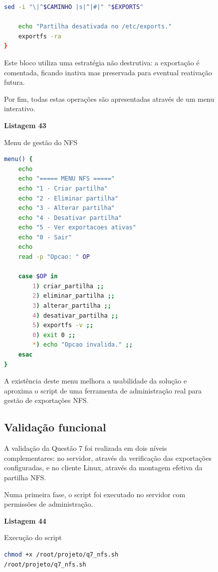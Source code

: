 \begin{figure}[H]
\begin{lstlisting}[language=bash,breaklines=true,basicstyle=\ttfamily\small,columns=fullflexible,keepspaces=true,showstringspaces=false]
    sed -i "\|^$CAMINHO |s|^|#|" "$EXPORTS"

    echo "Partilha desativada no /etc/exports."
    exportfs -ra
}
\end{lstlisting}

Este bloco utiliza uma estrat\'egia n\~ao destrutiva: a exporta\c{c}\~ao \'e comentada, ficando inativa mas preservada para eventual reativa\c{c}\~ao futura.

Por fim, todas estas opera\c{c}\~oes s\~ao apresentadas atrav\'es de um menu interativo.

\textbf{Listagem 43}

Menu de gest\~ao do NFS

\begin{lstlisting}[language=bash,breaklines=true,basicstyle=\ttfamily\small,columns=fullflexible,keepspaces=true,showstringspaces=false]
menu() {
    echo
    echo "===== MENU NFS ====="
    echo "1 - Criar partilha"
    echo "2 - Eliminar partilha"
    echo "3 - Alterar partilha"
    echo "4 - Desativar partilha"
    echo "5 - Ver exportacoes ativas"
    echo "0 - Sair"
    echo
    read -p "Opcao: " OP

    case $OP in
        1) criar_partilha ;;
        2) eliminar_partilha ;;
        3) alterar_partilha ;;
        4) desativar_partilha ;;
        5) exportfs -v ;;
        0) exit 0 ;;
        *) echo "Opcao invalida." ;;
    esac
}
\end{lstlisting}

A exist\^encia deste menu melhora a usabilidade da solu\c{c}\~ao e aproxima o script de uma ferramenta de administra\c{c}\~ao real para gest\~ao de exporta\c{c}\~oes NFS.

\subsection{Valida\c{c}\~ao funcional}

A valida\c{c}\~ao da Quest\~ao 7 foi realizada em dois n\'iveis complementares: no servidor, atrav\'es da verifica\c{c}\~ao das exporta\c{c}\~oes configuradas, e no cliente Linux, atrav\'es da montagem efetiva da partilha NFS.

Numa primeira fase, o script foi executado no servidor com permiss\~oes de administra\c{c}\~ao.

\textbf{Listagem 44}

Execu\c{c}\~ao do script

\begin{lstlisting}[language=bash,breaklines=true,basicstyle=\ttfamily\small,columns=fullflexible,keepspaces=true,showstringspaces=false]
chmod +x /root/projeto/q7_nfs.sh
/root/projeto/q7_nfs.sh
\end{lstlisting}


\end{figure}
